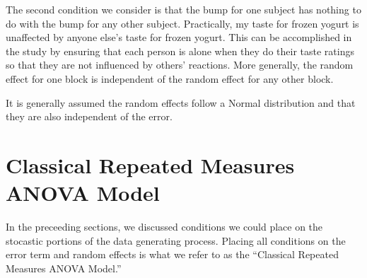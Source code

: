 \documentclass[
]{book}
\theoremstyle{plain}
\theoremstyle{mydefn}
\theoremstyle{myexmpl}
\theoremstyle{remark}
\begin{document}
The second condition we consider is that the bump for one subject has nothing to do with the bump for any other subject. Practically, my taste for frozen yogurt is unaffected by anyone else's taste for frozen yogurt. This can be accomplished in the study by ensuring that each person is alone when they do their taste ratings so that they are not influenced by others' reactions. More generally, the random effect for one block is independent of the random effect for any other block.

It is generally assumed the random effects follow a Normal distribution and that they are also independent of the error.

\hypertarget{classical-repeated-measures-anova-model}{%
\section{Classical Repeated Measures ANOVA Model}\label{classical-repeated-measures-anova-model}}

In the preceeding sections, we discussed conditions we could place on the stocastic portions of the data generating process. Placing all conditions on the error term and random effects is what we refer to as the ``Classical Repeated Measures ANOVA Model.''
\end{document}
